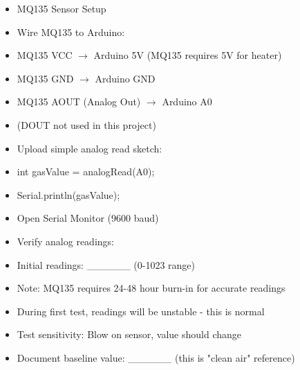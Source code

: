 \documentclass[11pt,letterpaper]{article}
\begin{document}
\begin{itemize}
  \item MQ135 Sensor Setup
  \item Wire MQ135 to Arduino:
  \item MQ135 VCC $\rightarrow$ Arduino 5V (MQ135 requires 5V for heater)
  \item MQ135 GND $\rightarrow$ Arduino GND
  \item MQ135 AOUT (Analog Out) $\rightarrow$ Arduino A0
  \item (DOUT not used in this project)
  \item Upload simple analog read sketch:
  \item int gasValue = analogRead(A0);
  \item Serial.println(gasValue);
  \item Open Serial Monitor (9600 baud)
  \item Verify analog readings:
  \item Initial readings: \_\_\_\_\_\_ (0-1023 range)
  \item Note: MQ135 requires 24-48 hour burn-in for accurate readings
  \item During first test, readings will be unstable - this is normal
  \item Test sensitivity: Blow on sensor, value should change
  \item Document baseline value: \_\_\_\_\_\_ (this is "clean air" reference)
\end{itemize}
\end{document}
